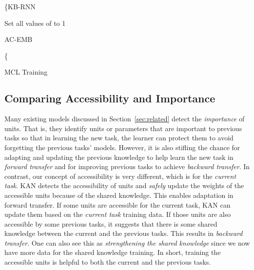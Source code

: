 \documentclass[runningheads]{llncs}
\begin{document}
\begin{algorithm}[H]
\DontPrintSemicolon
  \setcounter{AlgoLine}{0}
  
  \{KB-RNN  \label{TrainingKB:EncodeExample}

    {Set all values of  to 1 \label{TrainingKB:Seta_tOnes}}
  \Else
    {
      AC-EMB  \label{TrainingKB:start:a_t}
      
        \label{TrainingKB:end:a_t}   
    } 
    
  \{  \label{TrainingKB:Element-wiseMultiplication}  

   \label{TrainingKB:Classification}  


\caption{MCL Training}
\label{TrainingKB}
\end{algorithm}

\subsection{Comparing Accessibility and Importance}

Many existing models discussed in Section~\ref{sec:related} detect the {\em importance} of units. That is, they identify units or parameters that are important to previous tasks so that in learning the new task, the learner can protect them to avoid forgetting the previous tasks' models. However, it is also stifling the chance for adapting and updating the previous knowledge to help learn the new task in \textit{forward transfer} and for improving previous tasks to achieve {\em backward transfer}. In contrast, our concept of accessibility is very different, which is for the {\em current task}. KAN detects the accessibility of units and {\em safely} update the weights of the accessible units because of the shared knowledge. This enables adaptation in forward transfer. If some units are accessible for the current task, KAN can update them based on the {\em current task} training data. If those units are also accessible by some previous tasks, it suggests that there is some shared knowledge between the current and the previous tasks. This results in {\em backward transfer}. One can also see this as {\em strengthening the shared knowledge} since we now have more data for the shared knowledge training. In short, training the accessible units is helpful to both the current and the previous tasks.
\end{document}

